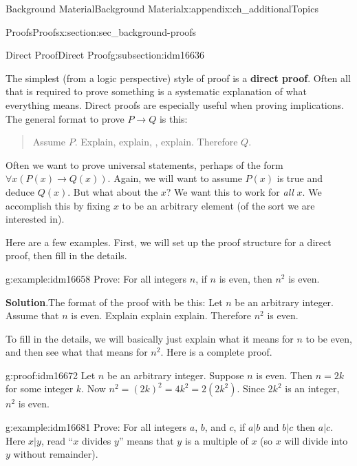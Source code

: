 \documentclass[oneside,10pt,]{book}
\newcommand{\terminology}[1]{\textbf{#1}}
\numberwithin{equation}{chapter}
\def\imp{\rightarrow}
\begin{document}
\begin{appendixptx}{Background Material}{}{Background Material}{}{}{x:appendix:ch_additionalTopics}
\begin{sectionptx}{Proofs}{}{Proofs}{}{}{x:section:sec_background-proofs}
\begin{introduction}{}
\end{introduction}%
%
%
\typeout{************************************************}
\typeout{************************************************}
%
\begin{subsectionptx}{Direct Proof}{}{Direct Proof}{}{}{g:subsection:idm16636}
%
\par
The simplest (from a logic perspective) style of proof is a \terminology{direct proof}. Often all that is required to prove something is a systematic explanation of what everything means. Direct proofs are especially useful when proving implications. The general format to prove \(P \imp Q\) is this:%
\begin{quote}%
Assume \(P\). Explain, explain, \textellipsis{}, explain. Therefore \(Q\).%
\end{quote}
Often we want to prove universal statements, perhaps of the form \(\forall x (P(x) \imp Q(x))\). Again, we will want to assume \(P(x)\) is true and deduce \(Q(x)\). But what about the \(x\)? We want this to work for \emph{all} \(x\). We accomplish this by fixing \(x\) to be an arbitrary element (of the sort we are interested in).%
\par
Here are a few examples. First, we will set up the proof structure for a direct proof, then fill in the details.%
\begin{example}{}{g:example:idm16658}%
Prove: For all integers \(n\), if \(n\) is even, then \(n^2\) is even.%
\par\smallskip%
\noindent\textbf{Solution}.\hypertarget{g:solution:idm16664}{}\quad{}The format of the proof with be this: Let \(n\) be an arbitrary integer. Assume that \(n\) is even. Explain explain explain. Therefore \(n^2\) is even.%
\par
To fill in the details, we will basically just explain what it means for \(n\) to be even, and then see what that means for \(n^2\). Here is a complete proof.%
\begin{proofptx}{}{g:proof:idm16672}
Let \(n\) be an arbitrary integer. Suppose \(n\) is even. Then \(n = 2k\) for some integer \(k\). Now \(n^2 = (2k)^2 = 4k^2 = 2(2k^2)\). Since \(2k^2\) is an integer, \(n^2\) is even.%
\end{proofptx}
\end{example}
\begin{example}{}{g:example:idm16681}%
Prove: For all integers \(a\), \(b\), and \(c\), if \(a|b\) and \(b|c\) then \(a|c\). Here \(x|y\), read ``\(x\) divides \(y\)'' means that \(y\) is a multiple of \(x\) (so \(x\) will divide into \(y\) without remainder).%

\end{example}
\end{subsectionptx}
\end{sectionptx}
\end{appendixptx}
\end{document}
